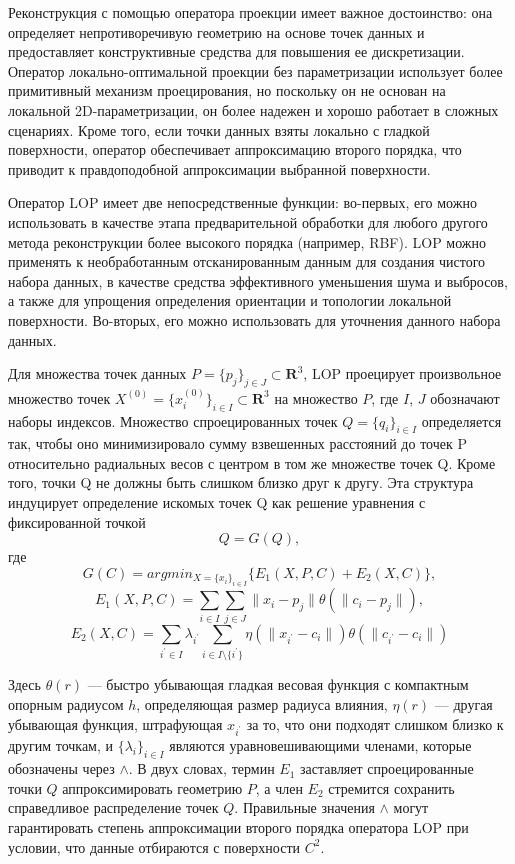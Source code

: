 Реконструкция с помощью оператора проекции имеет важное достоинство: она определяет непротиворечивую геометрию на основе точек данных и предоставляет конструктивные средства для повышения ее дискретизации. 
Оператор локально-оптимальной проекции без параметризации использует более примитивный механизм проецирования, но поскольку он не основан на локальной 2D-параметризации, он более надежен и хорошо работает в сложных сценариях. Кроме того, если точки данных взяты локально с гладкой поверхности, оператор обеспечивает аппроксимацию второго порядка, что приводит к правдоподобной аппроксимации выбранной поверхности.

Оператор LOP имеет две непосредственные функции: во-первых, его можно использовать в качестве этапа предварительной обработки для любого другого метода реконструкции более высокого порядка (например, RBF). LOP можно применять к необработанным отсканированным данным для создания чистого набора данных, в качестве средства эффективного уменьшения шума и выбросов, а также для упрощения определения ориентации и топологии локальной поверхности. Во-вторых, его можно использовать для уточнения данного набора данных.

Для множества точек данных $P = \{p_j\}_{j\in J} \subset \mathbf R^{3}$, LOP проецирует произвольное множество точек $X^{(0)} = \{x_i^{(0)} \} _{i \in I} \subset \mathbf R^{3}$ на множество $P$, где $I$, $J$ обозначают наборы индексов. Множество спроецированных точек $Q = \{q_i\}_{i\in I}$ определяется так, чтобы оно минимизировало сумму взвешенных расстояний до точек P относительно радиальных весов с центром в том же множестве точек Q. Кроме того, точки Q не должны быть слишком близко друг к другу. Эта структура индуцирует определение искомых точек Q как решение уравнения с фиксированной точкой 
$$Q = G(Q),$$
где
$$G(C) = argmin_{X = \{x_i\}_{i \in I}} \{E_1(X,P,C) + E_2(X,C)\},$$
$$E_1(X,P,C) = \sum_{i \in I} \sum_{j \in J}\parallel x_i - p_j \parallel \theta(\parallel c_i - p_j \parallel), $$ 
$$E_2(X, C) = \sum _{i^{'} \in I} \lambda_{i^{'}}\sum_{i \in I \setminus\{i^{'}\}} \eta(\parallel x_{i^{'}}- c_i  \parallel)\theta(\parallel c_{i^{'}} - c_i \parallel)$$

Здесь $\theta(r)$ — быстро убывающая гладкая весовая функция с компактным опорным радиусом $h$, определяющая размер радиуса влияния, $\eta(r)$ — другая убывающая функция, штрафующая $x_{i^{'}}$ за то, что они подходят слишком близко к другим точкам, и $\{\lambda_i\}_{i \in I}$ являются уравновешивающими членами, которые обозначены через $\mathbf \land$. В двух словах, термин $E_1$ заставляет спроецированные точки $Q$ аппроксимировать геометрию $P$, а член $E_2$ стремится  сохранить справедливое распределение точек $Q$. Правильные значения $\mathbf\land$ могут гарантировать степень аппроксимации второго порядка оператора LOP при условии, что данные отбираются с поверхности $C^{2}$.


